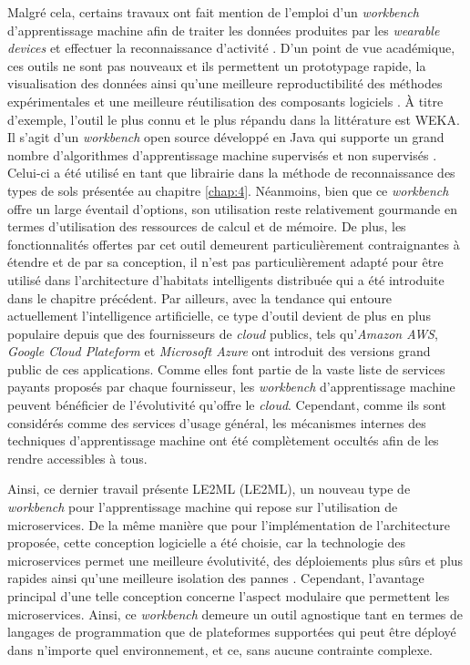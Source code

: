 Malgré cela, certains travaux ont fait mention de l'emploi d'un \textit{workbench} d'apprentissage machine afin de traiter les données produites par les \textit{wearable devices} et effectuer la reconnaissance d'activité \citep{Chapron2018}. D'un point de vue académique, ces outils ne sont pas nouveaux et ils permettent un prototypage rapide, la visualisation des données ainsi qu'une meilleure reproductibilité des méthodes expérimentales et une meilleure réutilisation des composants logiciels \citep{Holmes1994,Langlois2008}. À titre d'exemple, l'outil le plus connu et le plus répandu dans la littérature est \acs{WEKA}. Il s'agit d'un \textit{workbench} open source développé en Java qui supporte un grand nombre d'algorithmes d'apprentissage machine supervisés et non supervisés \citep{Witten2016}. Celui-ci a été utilisé en tant que librairie dans la méthode de reconnaissance des types de sols présentée au chapitre \ref{chap:4}. Néanmoins, bien que ce \textit{workbench} offre un large éventail d'options, son utilisation reste relativement gourmande en termes d'utilisation des ressources de calcul et de mémoire. De plus, les fonctionnalités offertes par cet outil demeurent particulièrement contraignantes à étendre et de par sa conception, il n'est pas particulièrement adapté pour être utilisé dans l'architecture d'habitats intelligents distribuée qui a été introduite dans le chapitre précédent. Par ailleurs, avec la tendance qui entoure actuellement l'intelligence artificielle, ce type d'outil devient de plus en plus populaire depuis que des fournisseurs de \textit{cloud} publics, tels qu'\textit{Amazon AWS}, \textit{Google Cloud Plateform} et \textit{Microsoft Azure} ont introduit des versions grand public de ces applications. Comme elles font partie de la vaste liste de services payants proposés par chaque fournisseur, les \textit{workbench} d'apprentissage machine peuvent bénéficier de l'évolutivité qu'offre le \textit{cloud}. Cependant, comme ils sont considérés comme des services d'usage général, les mécanismes internes des techniques d'apprentissage machine ont été complètement occultés afin de les rendre accessibles à tous.

Ainsi, ce dernier travail présente \acs{LE2ML} (\acl{LE2ML}), un nouveau type de \textit{workbench} pour l'apprentissage machine qui repose sur l'utilisation de microservices. De la même manière que pour l'implémentation de l'architecture proposée, cette conception logicielle a été choisie, car la technologie des microservices permet une meilleure évolutivité, des déploiements plus sûrs et plus rapides ainsi qu'une meilleure isolation des pannes \citep{Dragoni2017}. Cependant, l'avantage principal d'une telle conception concerne l'aspect modulaire que permettent les microservices. Ainsi, ce \textit{workbench} demeure un outil agnostique tant en termes de langages de programmation que de plateformes supportées qui peut être déployé dans n'importe quel environnement, et ce, sans aucune contrainte complexe.

